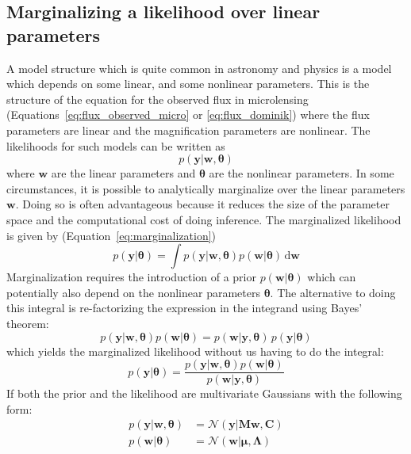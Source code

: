 \documentclass[12pt,dvipsnames]{report}
\newcommand{\ud}{\,\mathrm{d}}
\renewcommand{\vec}[1]{\boldsymbol{\mathbf{#1}}}
\begin{document}
\subsection{Marginalizing a likelihood over linear parameters}
A model structure which is quite common in astronomy and physics is a model
which depends on some linear, and some nonlinear parameters. This is the
structure of the equation for the observed flux in microlensing
(Equations~\ref{eq:flux_observed_micro} or \ref{eq:flux_dominik}) where the
flux parameters are linear and the magnification parameters are nonlinear. The
likelihoods for such models can be written as
\begin{equation}
    p(\vec{y}\lvert \vec{w}, \vec{\theta})
\end{equation}
where $\vec{w}$ are the linear parameters and $\vec{\theta}$ are the nonlinear parameters.
In some circumstances, it is possible to analytically marginalize over the linear
parameters $\vec{w}$. Doing so is often advantageous because it reduces the size of the
parameter space  and the computational cost of doing inference.
The marginalized likelihood is given by (Equation~\ref{eq:marginalization})
\begin{equation}
    p(\vec{y}\lvert \vec{\theta})=\int p(\vec{y}\lvert \vec{w}, \vec{\theta})p(\vec{w}\lvert \vec{\theta}) \ud\vec{w}
\end{equation}
Marginalization requires the introduction of a prior  $p(\vec{w}\lvert \vec{\theta})$
which can potentially also depend on the nonlinear parameters $\vec{\theta}$.
The alternative to doing this integral is re-factorizing the expression in the integrand
using Bayes' theorem:
\begin{equation}
    p(\vec{y}\lvert \vec{w}, \vec{\theta})p(\vec{w}\lvert \vec{\theta})  = p(\vec{w}\lvert \vec{y},\vec{\theta})\,p(\vec{y}\lvert \vec{\theta})
\end{equation}
which yields the marginalized likelihood without us having to do the integral:
\begin{equation}
    p(\vec{y}\lvert \vec{\theta}) = \frac{    p(\vec{y}\lvert \vec{w}, \vec{\theta})p(\vec{w}\lvert \vec{\theta})}{p(\vec{w}\lvert \vec{y},\vec{\theta})}
    \label{eq:likelihood_factorization}
\end{equation}
If both the prior and the likelihood are multivariate Gaussians with the following form:
\begin{align}
    p(\vec{y}\lvert \vec{w}, \vec{\theta}) & = \mathcal{N}(\vec{y}\lvert \vec{M}\vec{w},\vec{C})  \\
    p(\vec{w}\lvert \vec{\theta})          & = \mathcal{N}(\vec{w}\lvert \vec{\mu},\vec{\Lambda})
\end{align}
\end{document}
